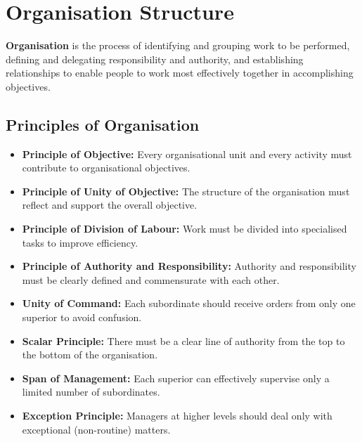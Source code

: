 \documentclass[12pt,a4paper]{article}
\begin{document}
\section{Organisation Structure}

\begin{tcolorbox}[defbox, title={\textbf{Organisation --- Definition}}]
\textbf{Organisation} is the process of identifying and grouping work to be performed, defining and delegating responsibility and authority, and establishing relationships to enable people to work most effectively together in accomplishing objectives.
\end{tcolorbox}

\subsection{Principles of Organisation}
\begin{itemize}[leftmargin=*, itemsep=3pt]
  \item \textbf{Principle of Objective:} Every organisational unit and every activity must contribute to organisational objectives.
  \item \textbf{Principle of Unity of Objective:} The structure of the organisation must reflect and support the overall objective.
  \item \textbf{Principle of Division of Labour:} Work must be divided into specialised tasks to improve efficiency.
  \item \textbf{Principle of Authority and Responsibility:} Authority and responsibility must be clearly defined and commensurate with each other.
  \item \textbf{Unity of Command:} Each subordinate should receive orders from only one superior to avoid confusion.
  \item \textbf{Scalar Principle:} There must be a clear line of authority from the top to the bottom of the organisation.
  \item \textbf{Span of Management:} Each superior can effectively supervise only a limited number of subordinates.
  \item \textbf{Exception Principle:} Managers at higher levels should deal only with exceptional (non-routine) matters.
\end{itemize}
\end{document}
